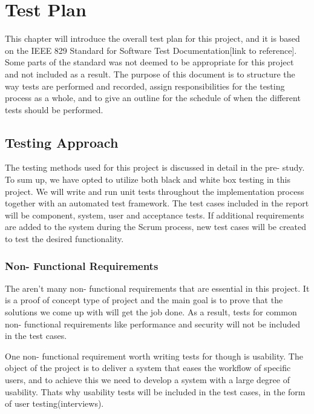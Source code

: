 \section{Test Plan}
This chapter will introduce the overall test plan for this project, and it is based on the IEEE 829 Standard for Software Test Documentation[link to reference]. Some parts of the standard was not deemed to be appropriate for this project and not included as a result. The purpose of this document is to structure the way tests are performed and recorded, assign responsibilities for the testing process as a whole, and to give an outline for the schedule of when the different tests should be performed.

\subsection{Testing Approach}
The testing methods used for this project is discussed in detail in the pre- study. To sum up, we have opted to utilize both black and white box testing in this project. We will write and run unit tests throughout the implementation process together with an automated test framework. The test cases included in the report will be component, system, user and acceptance tests. If additional requirements are added to the system during the Scrum process, new test cases will be created to test the desired functionality.

\subsubsection{Non- Functional Requirements}
The aren’t many non- functional requirements that are essential in this project. It is a proof of concept type of project and the main goal is to prove that the solutions we come up with will get the job done. As a result, tests for common non- functional requirements like performance and security will not be included in the test cases. 

One non- functional requirement worth writing tests for though is usability. The object of the project is to deliver a system that eases the workflow of specific users, and to achieve this we need to develop a system with a large degree of usability. Thats why usability tests will be included in the test cases, in the form of user testing(interviews).


